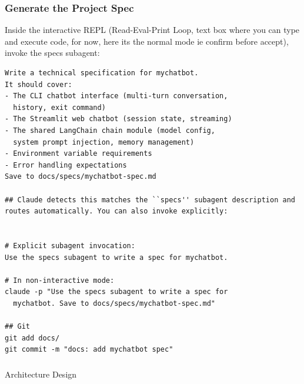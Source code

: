 \begin{frame}[fragile]\frametitle{Generate the Project Spec}
Inside the interactive REPL (Read-Eval-Print Loop, text box where you can type and execute code, for now, here its the normal mode ie confirm before accept), invoke the specs subagent:

\begin{lstlisting}
Write a technical specification for mychatbot.
It should cover:
- The CLI chatbot interface (multi-turn conversation,
  history, exit command)
- The Streamlit web chatbot (session state, streaming)
- The shared LangChain chain module (model config,
  system prompt injection, memory management)
- Environment variable requirements
- Error handling expectations
Save to docs/specs/mychatbot-spec.md

## Claude detects this matches the ``specs'' subagent description and routes automatically. You can also invoke explicitly:


# Explicit subagent invocation:
Use the specs subagent to write a spec for mychatbot.

# In non-interactive mode:
claude -p "Use the specs subagent to write a spec for 
  mychatbot. Save to docs/specs/mychatbot-spec.md"

## Git
git add docs/
git commit -m "docs: add mychatbot spec"
\end{lstlisting}
\end{frame}


\begin{frame}[fragile]\frametitle{}
\begin{center}
{\Large Architecture Design}

\end{center}
\end{frame}


